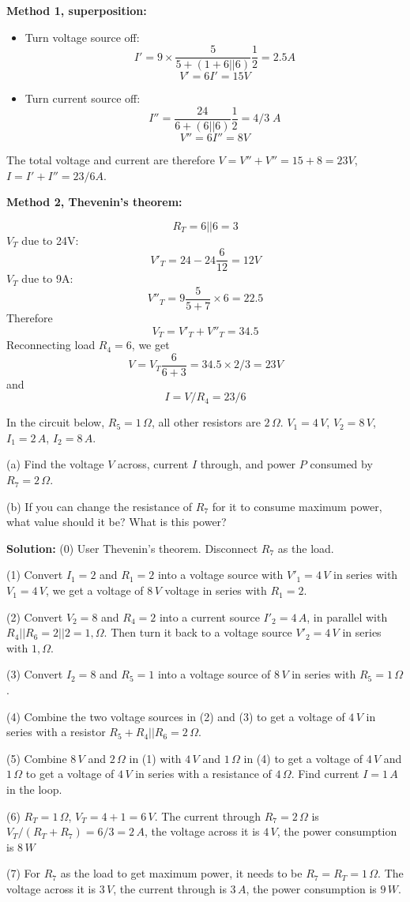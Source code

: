 \begin{enumerate}
  {\bf Method 1, superposition:}
    \begin{itemize}
    \item Turn voltage source off:
      \[ I'=9\times\frac{5}{5+(1+6||6)}\frac{1}{2}=2.5A \]
      \[ V'=6I'=15 V \]
    \item Turn current source off:
      \[ I''=\frac{24}{6+(6||6)}\frac{1}{2}=4/3\;A \]
      \[ V''=6I''=8V \]
  \end{itemize}
  The total voltage and current are therefore $V=V''+V''=15+8=23V$,
  $I=I'+I''=23/6A$.

  {\bf Method 2, Thevenin's theorem:}
  
  \[ R_T=6||6=3 \]
  $V_T$ due to 24V:
  \[ V'_T=24-24 \frac{6}{12}=12V \]
  $V_T$ due to 9A:
  \[ V''_T=9\frac{5}{5+7}\times 6=22.5 \]
  Therefore
  \[ V_T=V'_T+V''_T=34.5 \]
  Reconnecting load $R_4=6$, we get
  \[ V=V_T \frac{6}{6+3}=34.5\times 2/3=23 V \]
  and
  \[ I=V/R_4=23/6 \]


\end{enumerate}



  In the circuit below, $R_5=1\,\Omega$, all other resistors are
  $2\,\Omega$. $V_1=4\,V$, $V_2=8\,V$, $I_1=2\,A$, $I_2=8\,A$.

  (a) Find the voltage $V$ across, current $I$ through, and power
  $P$ consumed by $R_7=2\,\Omega$.
  

  (b) If you can change the resistance of $R_7$ for it to consume
  maximum power, what value should it be? What is this power?



  {\bf Solution:} 
  (0) User Thevenin's theorem. Disconnect $R_7$ as the load.

  (1) Convert $I_1=2$ and $R_1=2$ into a voltage source with $V'_1=4\,V$
  in series with $V_1=4\,V$, we get a voltage of $8\,V$ voltage in series 
  with $R_1=2$. 
  
  (2) Convert $V_2=8$ and $R_4=2$ into a current source $I'_2=4\,A$, in 
  parallel with $R_4||R_6=2||2=1,\Omega$. Then turn it back to a voltage 
  source $V'_2=4\,V$ in series with $1,\Omega$. 

  (3) Convert $I_2=8$ and $R_5=1$ into a voltage source of $8\,V$ in series
  with $R_5=1\,\Omega$.

  (4) Combine the two voltage sources in (2) and (3) to get a voltage of 
  $4\,V$ in series with a resistor $R_5+R_4||R_6=2\,\Omega$.

  (5) Combine $8\,V$ and $2\,\Omega$ in (1) with $4\,V$ and $1\,\Omega$ 
  in (4) to get a voltage of $4\,V$ and $1\,\Omega$ to get a voltage of 
  $4\,V$ in series with a resistance of $4\,\Omega$. Find current $I=1\,A$
  in the loop.

  (6) $R_T=1\,\Omega$, $V_T=4+1=6\,V$. The current through $R_7=2\,\Omega$
  is $V_T/(R_T+R_7)=6/3=2\,A$, the voltage across it is $4\,V$, the power
  consumption is $8\,W$

  (7) For $R_7$ as the load to get maximum power, it needs to be 
  $R_7=R_T=1\,\Omega$. The voltage across it is $3\,V$, the current 
  through is $3\,A$, the power consumption is $9\,W$.
